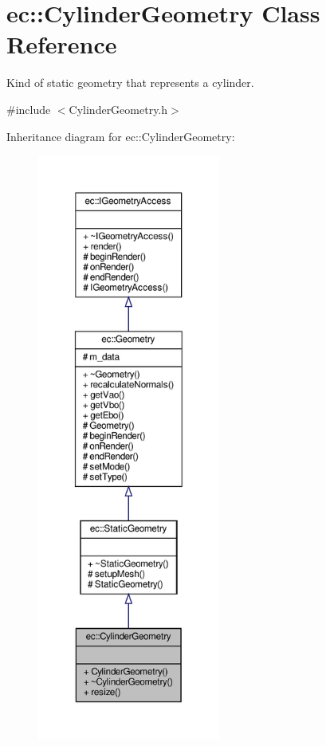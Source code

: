\hypertarget{classec_1_1_cylinder_geometry}{}\section{ec\+:\+:Cylinder\+Geometry Class Reference}
\label{classec_1_1_cylinder_geometry}


Kind of static geometry that represents a cylinder.  




{\ttfamily \#include $<$Cylinder\+Geometry.\+h$>$}



Inheritance diagram for ec\+:\+:Cylinder\+Geometry\+:\nopagebreak
\begin{figure}[H]
\begin{center}
\leavevmode
\includegraphics[height=550pt]{classec_1_1_cylinder_geometry__inherit__graph}
\end{center}
\end{figure}


